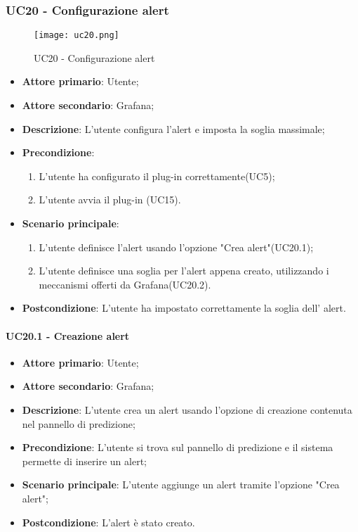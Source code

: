 \subsubsection{UC20 - Configurazione alert}
\label{sssec:uc20}

\begin{figure}[h!]
  \begin{center}
    \texttt{[image: uc20.png]}\\
    \caption{UC20 - Configurazione alert}%
    \label{fig:uc20}
  \end{center}
  \end{figure}

\begin{itemize}
  \item \textbf{Attore primario}: Utente;
  \item \textbf{Attore secondario}: Grafana;
  \item \textbf{Descrizione}: L'utente configura l'alert e imposta la soglia massimale;
  \item \textbf{Precondizione}:
  \begin{enumerate}
		\item L'utente ha configurato il plug-in correttamente(UC5);
		\item L'utente avvia il plug-in (UC15).
	\end {enumerate}
  \item \textbf{Scenario principale}:
  \begin{enumerate}
    \item L'utente definisce l'alert usando l'opzione "Crea alert"(UC20.1);
    \item L'utente definisce una soglia per l'alert appena creato, utilizzando i meccanismi offerti da Grafana(UC20.2).
  \end{enumerate}
  \item \textbf{Postcondizione}: L'utente ha impostato correttamente la soglia dell' alert.
\end{itemize}


\paragraph{UC20.1 - Creazione alert}
\label{para:uc20.1}
\begin{itemize}
  \item \textbf{Attore primario}: Utente;
  \item \textbf{Attore secondario}: Grafana;
  \item \textbf{Descrizione}: L'utente crea un alert usando l'opzione di creazione contenuta nel pannello di predizione;
  \item \textbf{Precondizione}: L'utente si trova sul pannello di predizione e il sistema permette di inserire un alert;
  \item \textbf{Scenario principale}: L'utente aggiunge un alert tramite l'opzione "Crea alert";
  \item \textbf{Postcondizione}: L'alert è stato creato.
\end{itemize}



